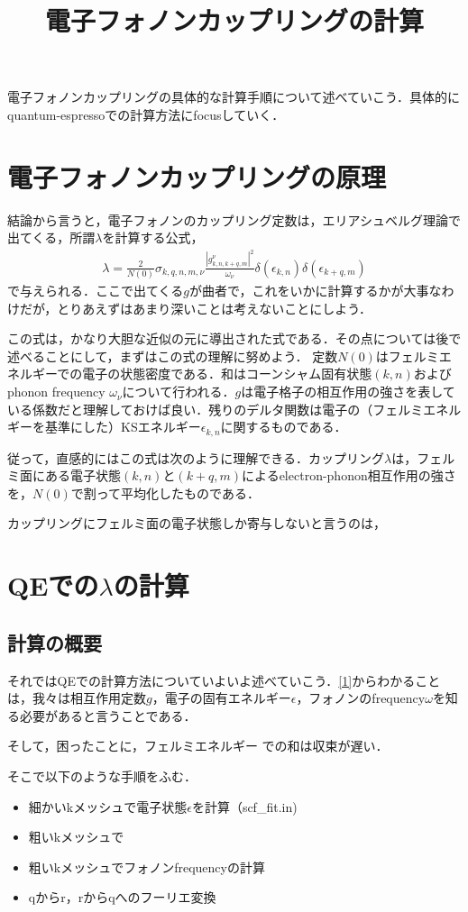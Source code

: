 \documentclass[a4j]{jarticle}
\title{電子フォノンカップリングの計算}
\author{}
\begin{document}
\maketitle
電子フォノンカップリングの具体的な計算手順について述べていこう．具体的にquantum-espressoでの計算方法にfocusしていく．

\section{電子フォノンカップリングの原理}
結論から言うと，電子フォノンのカップリング定数は，エリアシュベルグ理論で出てくる，所謂$\lambda$を計算する公式，
\begin{align}
 \lambda =\frac{2}{N(0)}\sigma_{k,q,n,m,\nu}\frac{|g_{k,n,k+q,m}^{\nu}|^2}{\omega_\nu }\delta(\epsilon_{k,n})\delta(\epsilon_{k+q,m})\label{1}
\end{align}
で与えられる．ここで出てくる$g$が曲者で，これをいかに計算するかが大事なわけだが，とりあえずはあまり深いことは考えないことにしよう．

この式は，かなり大胆な近似の元に導出された式である．その点については後で述べることにして，まずはこの式の理解に努めよう．
定数$N(0)$はフェルミエネルギーでの電子の状態密度である．和はコーンシャム固有状態$(k,n)$およびphonon frequency $\omega_{\nu}$について行われる．$g$は電子格子の相互作用の強さを表している係数だと理解しておけば良い．残りのデルタ関数は電子の（フェルミエネルギーを基準にした）KSエネルギー$\epsilon_{k,n}$に関するものである．

従って，直感的にはこの式は次のように理解できる．カップリング$\lambda$は，フェルミ面にある電子状態$(k,n)$と$(k+q,m)$によるelectron-phonon相互作用の強さを，$N(0)$で割って平均化したものである．

カップリングにフェルミ面の電子状態しか寄与しないと言うのは，


\section{QEでの$\lambda$の計算}
\subsection{計算の概要}
それではQEでの計算方法についていよいよ述べていこう．\eqref{1}からわかることは，我々は相互作用定数$g$，電子の固有エネルギー$\epsilon$，フォノンのfrequency$\omega$を知る必要があると言うことである．

そして，困ったことに，フェルミエネルギー での和は収束が遅い．

そこで以下のような手順をふむ．
\begin{itemize}
 \item 細かいkメッシュで電子状態$\epsilon$を計算（scf_fit.in)
 \item 粗いkメッシュで
 \item 粗いkメッシュでフォノンfrequencyの計算
 \item qからr，rからqへのフーリエ変換
\end{itemize}
\end{document}
